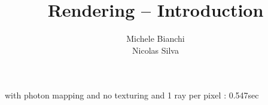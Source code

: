 \documentclass[9pt,a4paper]{scrreprt}
\title{Rendering -- Introduction}
\author{ Michele Bianchi \\ Nicolas Silva }
\begin{document}
\maketitle

\newpage


\newpage
%
%

\newpage



with photon mapping and no texturing and 1 ray per pixel : 0.547sec
\end{document}

